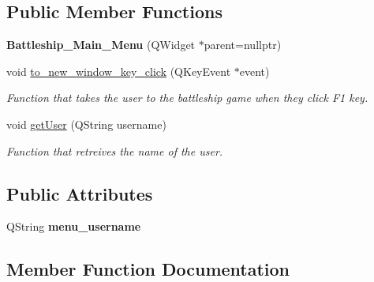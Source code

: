 \subsection*{Public Member Functions}
\begin{DoxyCompactItemize}
\item 
\mbox{\label{classBattleship__Main__Menu_ac59c49406eacad237384883a5a661217}} 
{\bfseries Battleship\+\_\+\+Main\+\_\+\+Menu} (Q\+Widget $\ast$parent=nullptr)
\item 
\mbox{\label{classBattleship__Main__Menu_ae8d3ea34b6127e1d0c5f7ec5fbe2fd46}} 
void \hyperlink{classBattleship__Main__Menu_ae8d3ea34b6127e1d0c5f7ec5fbe2fd46}{to\+\_\+new\+\_\+window\+\_\+key\+\_\+click} (Q\+Key\+Event $\ast$event)
\begin{DoxyCompactList}\small\item\em Function that takes the user to the battleship game when they click F1 key. \end{DoxyCompactList}\item 
void \hyperlink{classBattleship__Main__Menu_a0c52fabea744d8fa9397b6aa43ef7fb8}{get\+User} (Q\+String username)
\begin{DoxyCompactList}\small\item\em Function that retreives the name of the user. \end{DoxyCompactList}\end{DoxyCompactItemize}
\subsection*{Public Attributes}
\begin{DoxyCompactItemize}
\item 
\mbox{\label{classBattleship__Main__Menu_a6773ebebe3d05284fc73d2cd33956be2}} 
Q\+String {\bfseries menu\+\_\+username}
\end{DoxyCompactItemize}


\subsection{Member Function Documentation}
\mbox{\label{classBattleship__Main__Menu_a0c52fabea744d8fa9397b6aa43ef7fb8}} 

